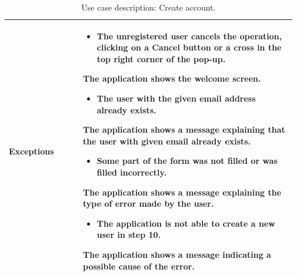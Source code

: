 \begin{table}[H]
\begin{tabular}{@{}p{0.25\linewidth} p{0.72\linewidth}@{}}
		\textbf{Exceptions}         & \begin{itemize}[leftmargin=.4cm,noitemsep,topsep=0pt,before=\vspace{-3mm}]
		   \item The unregistered user cancels the operation, clicking on a Cancel button or a cross in the top right corner of the pop-up.
		\end{itemize}
		The application shows the welcome screen.
		\begin{itemize}[leftmargin=.4cm,noitemsep,topsep=0pt]
		   \item The user with the given email address already exists. 
		\end{itemize}
		The application shows a message explaining that the user with given email already exists.
		\begin{itemize}[leftmargin=.4cm,noitemsep,topsep=0pt]
		   \item Some part of the form was not filled or was filled incorrectly.
		\end{itemize}
		The application shows a message explaining the type of error made by the user.
	    \begin{itemize}[leftmargin=.4cm,noitemsep,topsep=0pt]
		   \item The application is not able to create a new user in step 10.
		\end{itemize}
		The application shows a message indicating a possible cause of the error.
	    \\\bottomrule
	\end{tabular}
	\caption{Use case description: Create account.}
\end{table}

